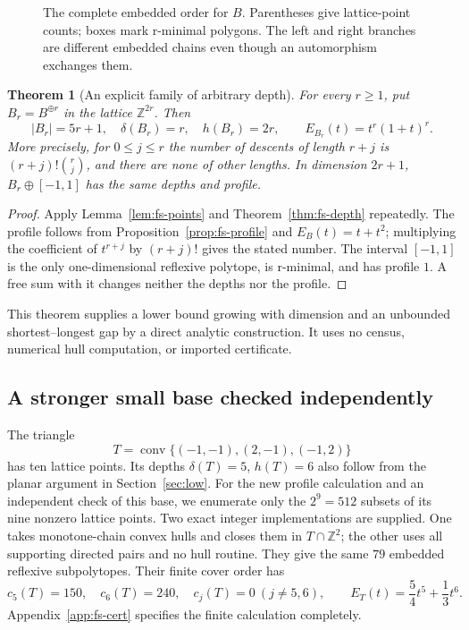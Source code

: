 \documentclass[manuscript]{aomart}
\newtheorem{theorem}{Theorem}
\theoremstyle{definition}
\theoremstyle{remark}
\newcommand{\Z}{\mathbb{Z}}
\newcommand{\conv}{\operatorname{conv}}
\begin{document}
\begin{figure}[ht]
\centering
{}
\caption{The complete embedded order for $B$. Parentheses give lattice-point
counts; boxes mark r-minimal polygons. The left and right branches are
different embedded chains even though an automorphism exchanges them.}
\label{fig:fs-base}
\end{figure}

\begin{theorem}[An explicit family of arbitrary depth]\label{thm:fs-family}
For every $r\ge1$, put $B_r=B^{\oplus r}$ in the lattice $\Z^{2r}$.
Then
\[
 |B_r|=5r+1,\quad\delta(B_r)=r,\quad h(B_r)=2r,
 \qquad E_{B_r}(t)=t^r(1+t)^r.
\]
More precisely, for $0\le j\le r$ the number of descents of length
$r+j$ is $(r+j)!\binom rj$, and there are none of other lengths.
In dimension $2r+1$, $B_r\oplus[-1,1]$ has the same depths and profile.
\end{theorem}
\begin{proof}
Apply Lemma~\ref{lem:fs-points} and
Theorem~\ref{thm:fs-depth} repeatedly. The profile follows from
Proposition~\ref{prop:fs-profile} and $E_B(t)=t+t^2$; multiplying the
coefficient of $t^{r+j}$ by $(r+j)!$ gives the stated number.
The interval $[-1,1]$ is the only one-dimensional reflexive polytope,
is r-minimal, and has profile $1$. A free sum with it changes neither
the depths nor the profile.
\end{proof}

This theorem supplies a lower bound growing with dimension and an
unbounded shortest--longest gap by a direct analytic construction.
It uses no census, numerical hull computation, or imported certificate.

\subsection{A stronger small base checked independently}
The triangle
\[
 T=\conv\{(-1,-1),(2,-1),(-1,2)\}
\]
has ten lattice points. Its depths $\delta(T)=5$, $h(T)=6$ also follow
from the planar argument in Section~\ref{sec:low}. For the new profile
calculation and an independent check of this base, we enumerate only
the $2^9=512$ subsets of its nine nonzero lattice points.
Two exact integer implementations are supplied. One takes monotone-chain
convex hulls and closes them in $T\cap\Z^2$; the other uses all supporting
directed pairs and no hull routine. They give the same $79$ embedded
reflexive subpolytopes. Their finite cover order has
\[
 c_5(T)=150,\quad c_6(T)=240,\quad c_j(T)=0\ (j\ne5,6),\qquad
 E_T(t)=\frac54t^5+\frac13t^6.
\]
Appendix~\ref{app:fs-cert} specifies the finite calculation completely.
\end{document}

